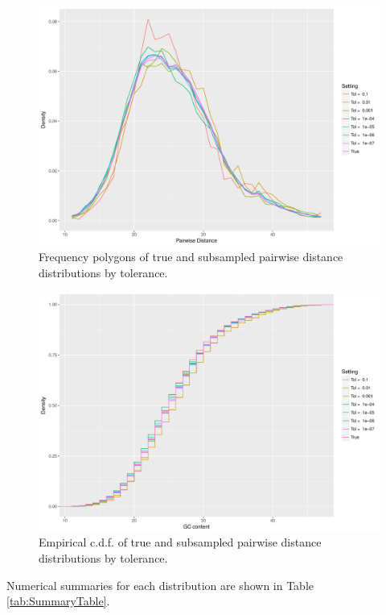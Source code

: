\documentclass{article}
\begin{document}
\begin{figure}
    \includegraphics[width=\linewidth]{Figures/freqpoly_by_tol.pdf}
    \caption{Frequency polygons of true and subsampled pairwise distance distributions by tolerance.}
    \label{fig:FreqPoly}
\end{figure}
\begin{figure}
    \includegraphics[width=\linewidth]{Figures/ecdf_by_tol.pdf}
    \caption{Empirical c.d.f. of true and subsampled pairwise distance distributions by tolerance.}
    \label{fig:ECDF}
\end{figure}

Numerical summaries for each distribution are shown in Table \ref{tab:SummaryTable}.
\end{document}
